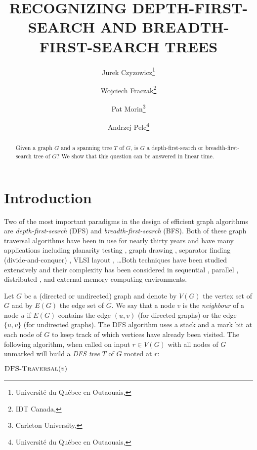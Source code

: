 \documentclass[lotsofwhite]{patmorin}
\title{\MakeUppercase{Recognizing Depth-First-Search and
	Breadth-First-Search Trees}}
\author{Jurek Czyzowicz\thanks{%
		Universit\'e du Qu\'ebec en Outaouais,
		\email{jurek@uqo.ca}} \and
	Wojciech Fraczak\thanks{%
		IDT Canada,
		\email{wojtek.fraczak@idt.com}} \and
	Pat Morin\thanks{%
		Carleton University,
		\email{morin@cs.carleton.ca}} \and
	Andrzej Pelc\thanks{%
		Universit\'e du Qu\'ebec en Outaouais,
		\email{pelc@uqo.ca}}}
\date{}
\newcommand{\dfst}{\textsc{DFS-Traversal}}
\begin{document}
\maketitle

\begin{abstract} 
Given a graph $G$ and a spanning tree $T$ of $G$, is $G$ a
depth-first-search or breadth-first-search tree of $G$?  We show that
this question can be answered in linear time.
\end{abstract}

\section{Introduction}

Two of the most important paradigms in the design of efficient graph
algorithms are \emph{depth-first-search} (DFS) and
\emph{breadth-first-search} (BFS).  Both of these graph traversal
algorithms have been in use for nearly thirty years and have many
applications including planarity testing \cite{X}, graph drawing
\cite{X}, separator finding (divide-and-conquer) \cite{X}, VLSI layout
\cite{X}, \ldots Both techniques have been studied extensively and
their complexity has been considered in sequential \cite{X}, parallel
\cite{X}, distributed \cite{X}, and external-memory \cite{X} computing
environments.

Let $G$ be a (directed or undirected) graph and denote by $V(G)$ the
vertex set of $G$ and by $E(G)$ the edge set of $G$.  We say that a
node $v$ is the \emph{neighbour} of a node $u$ if $E(G)$ contains the
edge $(u,v)$ (for directed graphs) or the edge $\{u,v\}$ (for
undirected graphs).  The DFS algorithm uses a stack and a mark bit at
each node of $G$ to keep track of which vertices have already been
visited.  The following algorithm, when called on input $r\in V(G)$
with all nodes of $G$ unmarked will build a \emph{DFS tree} $T$ of $G$
rooted at $r$:

\noindent
\begin{minipage}{\textwidth}
$\dfst(v)$
\begin{algorithmic}[1]
  \ELSE
  \ENDIF
\ENDWHILE
\end{algorithmic}
\end{minipage}
\end{document}
